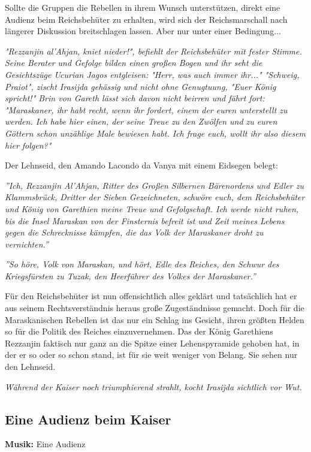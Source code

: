 Sollte die Gruppen die Rebellen in ihrem Wunsch unterstützen, direkt eine Audienz beim Reichsbehüter zu erhalten, wird sich der Reichsmarschall nach längerer Diskussion breitschlagen lassen. Aber nur unter einer Bedingung...

\emph{"Rezzanjin al'Ahjan, kniet nieder!", befiehlt der Reichsbehüter mit fester Stimme. Seine Berater und Gefolge bilden einen großen Bogen und ihr seht die Gesichtszüge Ucurian Jagos entgleisen: "Herr, was auch immer ihr..." "Schweig, Praiot", zischt Irasijda gehässig und nicht ohne Genugtuung, "Euer König spricht!" Brin von Gareth lässt sich davon nicht beirren und fährt fort: "Maraskaner, ihr habt recht, wenn ihr fordert, einem der euren unterstellt zu werden. Ich habe hier einen, der seine Treue zu den Zwölfen und zu euren Göttern schon unzählige Male bewiesen habt. Ich frage euch, wollt ihr also diesem hier folgen?"}

Der Lehnseid, den Amando Lacondo da Vanya mit einem Eidsegen belegt:

\emph{''Ich, Rezzanjin Al'Ahjan, Ritter des Großen Silbernen Bärenordens und Edler zu Klammsbrück, Dritter der Sieben Gezeichneten, schwöre euch, dem Reichsbehüter und König von Garethien meine Treue und Gefolgschaft. Ich werde nicht ruhen, bis die Insel Maraskan von der Finsternis befreit ist und Zeit meines Lebens gegen die Schrecknisse kämpfen, die das Volk der Maraskaner droht zu vernichten.''}

\emph{''So höre, Volk von Maraskan, und hört, Edle des Reiches, den Schwur des Kriegsfürsten zu Tuzak, den Heerführer des Volkes der Maraskaner.''}

Für den Reichsbehüter ist nun offensichtlich alles geklärt und tatsächlich hat er aus seinem Rechtsverständnis heraus große Zugeständnisse gemacht. Doch für die Maraskanischen Rebellen ist das nur ein Schlag ins Gesicht, ihren größten Helden so für die Politik des Reiches einzuvernehmen. Das der König Garethiens Rezzanjin faktisch nur ganz an die Spitze einer Lehenspyramide gehoben hat, in der er so oder so schon stand, ist für sie weit weniger von Belang. Sie sehen nur den Lehnseid.


\emph{Während der Kaiser noch triumphierend strahlt, kocht Irasijda sichtlich vor Wut. }

\subsection{Eine Audienz beim Kaiser}
\textbf{Musik:} Eine Audienz

